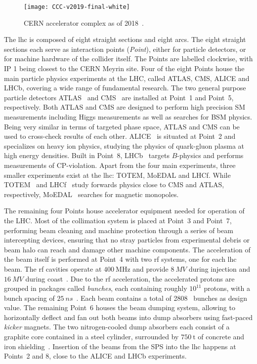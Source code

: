 \begin{figure}
	\centering    
	\texttt{[image: CCC-v2019-final-white]}
	\caption[CERN accelerator complex]{CERN accelerator complex as of 2018~\cite{Mobs:2684277}.}
	\label{fig:accelerator_complex}
\end{figure}

The \gls{lhc} is composed of eight straight sections and eight arcs. The eight straight sections each serve as interaction points (\textit{Point}), either for particle detectors, or for machine hardware of the collider itself. The Points are labelled clockwise, with IP 1 being closest to the CERN Meyrin site. Four of the eight Points house the main particle physics experiments at the LHC, called ATLAS, CMS, ALICE and LHCb, covering a wide range of fundamental research. The two general purpose particle detectors ATLAS~\cite{Aad:2008zzm} and CMS~\cite{Chatrchyan:2008aa} are installed at Point~1 and Point~5, respectively. Both ATLAS and CMS are designed to perform high precision SM measurements including Higgs measurements as well as searches for BSM physics. Being very similar in terms of targeted phase space, ATLAS and CMS can be used to cross-check results of each other. ALICE~\cite{Aamodt:2008zz} is situated at Point~2 and specializes on heavy ion physics, studying the physics of quark-gluon plasma at high energy densities. Built in Point~8, LHCb~\cite{Alves:2008zz} targets $B$-physics and performs measurements of CP-violation. Apart from the four main experiments, three smaller experiments exist at the \gls{lhc}: TOTEM, MoEDAL and LHCf. While TOTEM~\cite{Anelli:2008zza} and LHCf~\cite{Adriani:2006jd} study forwards physics close to CMS and ATLAS, respectively, MoEDAL~\cite{Pinfold:2009oia} searches for magnetic monopoles.

The remaining four Points house accelerator equipment needed for operation of the LHC. Most of the collimation system is placed at Point~3 and Point~7, performing beam cleaning and machine protection through a series of beam intercepting devices, ensuring that no stray particles from experimental debris or beam halo can reach and damage other machine components. The acceleration of the beam itself is performed at Point~4 with two \gls{rf} systems, one for each \gls{lhc} beam. The \gls{rf} cavities operate at $\SI{400}{\MHz}$ and provide $\SI{8}{MV}$ during injection and $\SI{16}{MV}$ during coast~\cite{Evans:1129806}. Due to the \gls{rf} acceleration, the accelerated protons are grouped in packages called \textit{bunches}, each containing roughly $10^{11}$ protons, with a bunch spacing of $\SI{25}{ns}$~\cite{Evans:1129806}. Each beam contains a total of 2808~\cite{Evans:1129806} bunches as design value. The remaining Point~6 houses the beam dumping system, allowing to horizontally deflect and fan out both beams into dump absorbers using fast-paced \textit{kicker} magnets. The two nitrogen-cooled dump absorbers each consist of a graphite core contained in a steel cylinder, surrounded by $\SI{750}{\tonne}$ of concrete and iron shielding~\cite{Bruning:782076}. Insertion of the beams from the SPS into the \gls{lhc} happens at Points~2 and 8, close to the ALICE and LHCb experiments.

